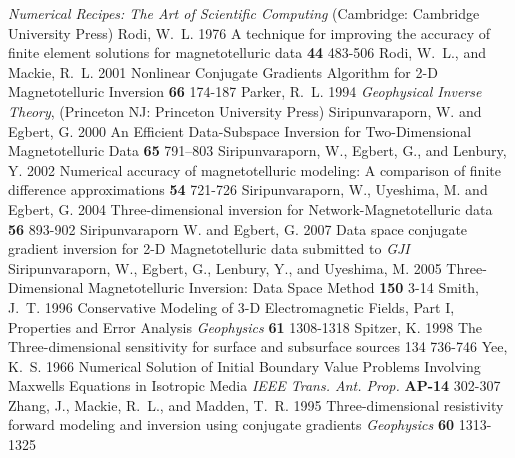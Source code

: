 \begin{thebibliography}{}
{\em Numerical Recipes: The Art of Scientific Computing}
(Cambridge: Cambridge University Press)
%
\bibitem{}
Rodi, W.~L. 1976
A technique for improving the accuracy of finite element solutions for
magnetotelluric data
{\em \GJRAS} {\bf 44} 483-506
%
\bibitem{}
Rodi, W.~L., and Mackie, R.~L. 2001
Nonlinear Conjugate Gradients Algorithm for 2-D Magnetotelluric
Inversion
{\em \GPH} {\bf 66} 174-187
%
\bibitem{}
Parker, R.~L. 1994
{\it Geophysical Inverse Theory},
(Princeton NJ: Princeton University Press)
%
\bibitem{}
Siripunvaraporn, W. and Egbert, G. 2000
An Efficient Data-Subspace Inversion for Two-Dimensional
Magnetotelluric Data
{\em \GPH} {\bf 65} 791--803
%
\bibitem{}
Siripunvaraporn, W., Egbert, G., and Lenbury, Y. 2002
Numerical accuracy of magnetotelluric
modeling: A comparison of finite difference approximations
{\em \EPS} {\bf 54} 721-726
%
\bibitem{}
Siripunvaraporn, W., Uyeshima, M. and Egbert, G. 2004
Three-dimensional inversion for Network-Magnetotelluric data
{\em \EPS} {\bf 56} 893-902
%
\bibitem{}
Siripunvaraporn W. and Egbert, G. 2007
Data space conjugate  gradient inversion for 2-D Magnetotelluric  data
submitted to {\em GJI}
%
\bibitem{}
Siripunvaraporn, W., Egbert, G., Lenbury, Y., and Uyeshima, M. 2005
Three-Dimensional Magnetotelluric Inversion: Data Space Method
{\em \PEPI} {\bf 150} 3-14
%
\bibitem{}
Smith, J.~T. 1996
Conservative Modeling of 3-D Electromagnetic Fields, Part I, Properties
and Error Analysis
{\em Geophysics} {\bf 61} 1308-1318
%
\bibitem{}
Spitzer, K. 1998
The Three-dimensional sensitivity for surface and subsurface sources
{\em \GJI} {134} 736-746
%
\bibitem{}
Yee, K.~S. 1966
Numerical Solution of Initial Boundary Value Problems Involving
Maxwells Equations in Isotropic Media
{\em IEEE Trans. Ant. Prop.} {\bf AP-14} 302-307
%
\bibitem{}
Zhang, J., Mackie, R.~L., and Madden, T.~R. 1995
Three-dimensional resistivity forward modeling and inversion
using conjugate gradients
{\em Geophysics} {\bf 60} 1313-1325

\end{thebibliography}
